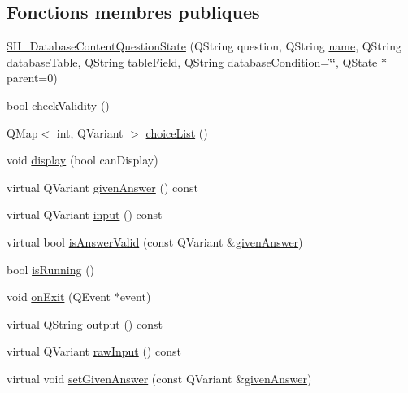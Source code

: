 \subsection*{Fonctions membres publiques}
\begin{DoxyCompactItemize}
\item 
\hyperlink{classSimpleHotel_1_1SH__DatabaseContentQuestionState_a91df6c69a129ca799d29610b3332747d}{S\-H\-\_\-\-Database\-Content\-Question\-State} (Q\-String question, Q\-String \hyperlink{classSimpleHotel_1_1SH__NamedObject_ad144716345034c91cface8f3163a799e}{name}, Q\-String database\-Table, Q\-String table\-Field, Q\-String database\-Condition=\char`\"{}\char`\"{}, \hyperlink{classQState}{Q\-State} $\ast$parent=0)
\item 
bool \hyperlink{classSimpleHotel_1_1SH__QuestionState_a0fd7e76443cfd6f0329b085358e30355}{check\-Validity} ()
\item 
Q\-Map$<$ int, Q\-Variant $>$ \hyperlink{classSimpleHotel_1_1SH__DatabaseContentQuestionState_a86e7bfe0585fc6c63fef4db80247221e}{choice\-List} ()
\item 
void \hyperlink{classSimpleHotel_1_1SH__InOutState_a1cbe5befe4f42e0941165498ed0117a9}{display} (bool can\-Display)
\item 
virtual Q\-Variant \hyperlink{classSimpleHotel_1_1SH__QuestionState_a243f09bc1f822af7748edb038ac2957c}{given\-Answer} () const 
\item 
virtual Q\-Variant \hyperlink{classSimpleHotel_1_1SH__InOutState_a487d2ca6200fed372b1a27cfa27774db}{input} () const 
\item 
virtual bool \hyperlink{classSimpleHotel_1_1SH__DatabaseContentQuestionState_aafab321e3b2db8fd4f311040d37b0e1e}{is\-Answer\-Valid} (const Q\-Variant \&\hyperlink{classSimpleHotel_1_1SH__QuestionState_a243f09bc1f822af7748edb038ac2957c}{given\-Answer})
\item 
bool \hyperlink{classSimpleHotel_1_1SH__GenericState_a5151ff071129bdd4dcf7c60cb93794da}{is\-Running} ()
\item 
void \hyperlink{classSimpleHotel_1_1SH__InOutState_aa5fc1b9281087bd8abcd6873d2a36009}{on\-Exit} (Q\-Event $\ast$event)
\item 
virtual Q\-String \hyperlink{classSimpleHotel_1_1SH__InOutState_a71b15e4d49b9c2aa540500065ceb39da}{output} () const 
\item 
virtual Q\-Variant \hyperlink{classSimpleHotel_1_1SH__DatabaseContentQuestionState_af7b1002ee7209e3e8238a5e11fd0294b}{raw\-Input} () const 
\item 
virtual void \hyperlink{classSimpleHotel_1_1SH__QuestionState_aeb4464741ecd13b283c504def63dd619}{set\-Given\-Answer} (const Q\-Variant \&\hyperlink{classSimpleHotel_1_1SH__QuestionState_a243f09bc1f822af7748edb038ac2957c}{given\-Answer})

\end{DoxyCompactItemize}
